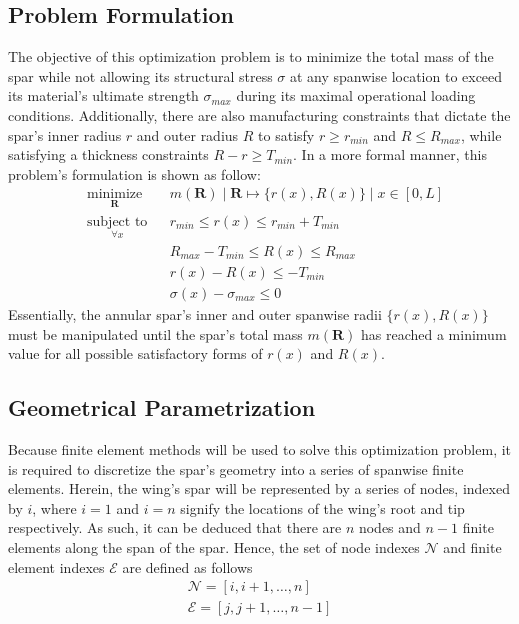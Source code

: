 \documentclass{article}
\begin{document}
\subsection{Problem Formulation}\label{opt}
The objective of this optimization problem is to minimize the total mass of the spar while not allowing its structural stress $\sigma$ at any spanwise location to exceed its material's ultimate strength $\sigma_{max}$ during its maximal operational loading conditions. Additionally, there are also manufacturing constraints that dictate the spar's inner radius $r$ and outer radius $R$ to satisfy $r \geq r_{min}$ and $R \leq R_{max}$, while satisfying a thickness constraints $R - r \geq T_{min}$. In a more formal manner, this problem's formulation is shown as follow:
$$
\begin{aligned}
& \underset{\mathbf{R}}{\text{minimize}} 
& & m(\mathbf{R}) \mid \mathbf{R} \mapsto \{ r(x), R(x) \} \mid x \in [0,L] \\
& \underset{\forall x}{\text{subject to}}
& &  r_{min} \leq r(x) \leq r_{min} + T_{min}\\
& & & R_{max} - T_{min} \leq R(x) \leq R_{max}\\
& & & r(x) - R(x) \leq -T_{min} \\
& & & \sigma(x) - \sigma_{max} \leq 0
\end{aligned}
$$
Essentially, the annular spar's inner and outer spanwise radii $\{ r(x), R(x) \}$ must be manipulated until the spar's total mass $m(\mathbf{R})$ has reached a minimum value for all possible satisfactory forms of $r(x)$ and $R(x)$. 

\subsection{Geometrical Parametrization}
Because finite element methods will be used to solve this optimization problem, it is required to discretize the spar's geometry into a series of spanwise finite elements. Herein, the wing's spar will be represented by a series of nodes, indexed by $i$, where $i=1$ and $i=n$ signify the locations of the wing's root and tip respectively. As such, it can be deduced that there are $n$ nodes and $n-1$ finite elements along the span of the spar. Hence, the set of node indexes $\mathcal{N}$ and finite element indexes $\mathcal{E}$ are defined as follows
$$
\begin{gathered}
\mathcal{N} = [i, i+1, \dots, n] \\
\mathcal{E} = [j, j+1, \dots, n-1]
\end{gathered}
$$
\end{document}
